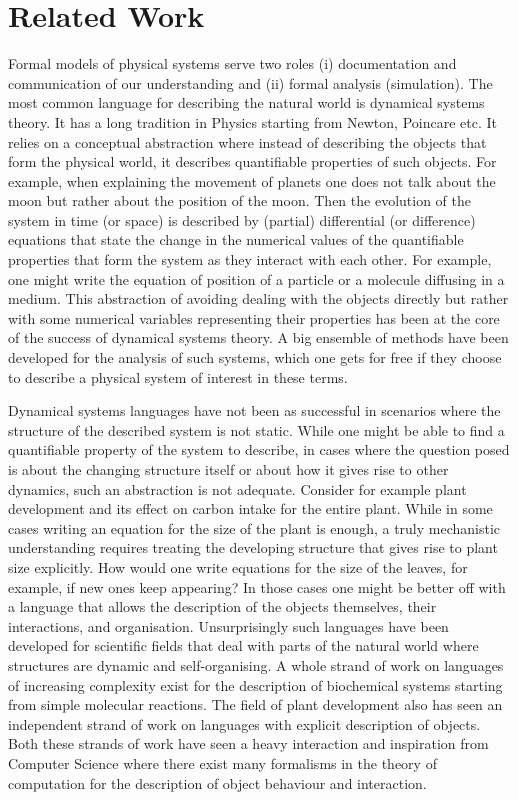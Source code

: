 \documentclass[phd]{infthesis}
\begin{document}
\chapter{Related Work}
\label{chp:oc}
Formal models of physical systems serve two roles (i) documentation and
communication of our understanding and (ii) formal analysis (simulation). The
most common language for describing the natural world is dynamical systems
theory. It has a long tradition in Physics starting from Newton, Poincare
etc. It relies on a conceptual abstraction where instead of describing the
objects that form the physical world, it describes quantifiable properties of
such objects. For example, when explaining the movement of planets one does not
talk about the moon but rather about the position of the moon. Then the
evolution of the system in time (or space) is described by (partial)
differential (or difference) equations that state the change in the numerical
values of the quantifiable properties that form the system as they interact with
each other. For example, one
might write the equation of position of a particle or a molecule diffusing in a
medium. This abstraction of avoiding dealing with the objects directly but
rather with some numerical variables representing their properties has been at
the core of the success of dynamical systems theory. A big ensemble of methods
have been developed for the analysis of such systems, which one gets for free if
they choose to describe a physical system of interest in these terms.

Dynamical systems languages have not been as successful in scenarios where the
structure of the  described system is not static. While one might be able to
find a quantifiable property of the system to describe, in cases where the
question posed is about the changing structure itself or about how it gives rise
to other dynamics, such an abstraction is not adequate. Consider for example
plant development and its effect on carbon intake for the entire
plant. While in some cases writing an equation for the size of the plant is
enough, a truly mechanistic understanding requires treating the developing structure that
gives rise to plant size explicitly. How would one write equations for the size
of the leaves, for example, if new ones keep appearing?
In those cases one might be better off with a language that allows the
description of the objects themselves, their interactions, and
organisation. Unsurprisingly such languages have been developed for
scientific fields that deal with parts of the natural world where structures are
dynamic and self-organising. A whole strand of work on languages of
increasing complexity exist for the description of biochemical systems starting
from simple molecular reactions. The field of plant development also has seen an
independent strand of work on languages with explicit description of objects.
Both these strands of work have seen a heavy interaction and inspiration 
from Computer Science where there exist many formalisms in the
theory of computation for the description of object behaviour and interaction.
\end{document}

